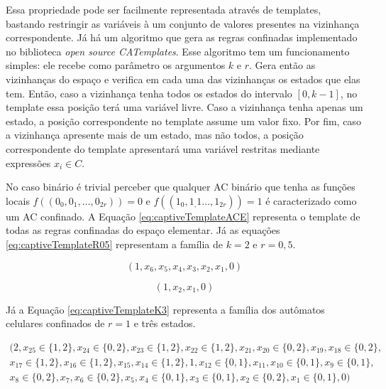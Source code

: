 \documentclass[12pt,a4paper]{article}
\begin{document}
	Essa propriedade pode ser facilmente representada através de templates, bastando restringir as variáveis à um conjunto de valores presentes na vizinhança correspondente. Já há um algoritmo que gera as regras confinadas implementado no biblioteca \textit{open source CATemplates}. Esse algoritmo tem um funcionamento simples: ele recebe como parâmetro os argumentos $k$ e $r$. Gera então as vizinhanças do espaço e verifica em cada uma das vizinhanças os estados que elas tem. Então, caso a vizinhança tenha todos os estados do intervalo $[0, k-1]$, no template essa posição terá uma variável livre. Caso a vizinhança tenha apenas um estado, a posição correspondente no template assume um valor fixo. Por fim, caso a vizinhança apresente mais de um estado, mas não todos, a posição correspondente do template apresentará uma variável restritas mediante expressões $x_i \in C$.

	No caso binário é trivial perceber que qualquer AC binário que tenha as funções locais $f((0_0, 0_1,\dots, 0_{2r})) = 0$ e $f((1_0, 1_,1\dots, 1_{2r})) = 1$ é caracterizado como um AC confinado. A Equação \ref{eq:captiveTemplateACE} representa o template de todas as regras confinadas do espaço elementar. Já as equações \ref{eq:captiveTemplateR05} representam a família de $k=2$ e $r=0,5$.

	\begin{equation}
	(1,x_6,x_5,x_4,x_3,x_2,x_1,0)
	\label{eq:captiveTemplateACE}
	\end{equation}

	\begin{equation}
	(1,x_2,x_1,0)
	\label{eq:captiveTemplateR05}
	\end{equation}

	Já a Equação \ref{eq:captiveTemplateK3} representa a família dos autômatos celulares confinados de $r=1$ e três estados.

	\begin{equation}
	\begin{split}
	(2, x_{25} \in \{1,2\}, x_{24} \in \{0,2\}, x_{23} \in \{1,2\}, x_{22} \in \{1,2\}, x_{21}, x_{20} \in \{0,2\}, x_{19}, x_{18} \in \{0,2\}, \\
	x_{17} \in \{1,2\}, x_{16} \in \{1,2\}, x_{15}, x_{14} \in \{1,2\},1, x_{12} \in \{0,1\}, x_{11}, x_{10} \in \{0,1\}, x_9 \in \{0,1\}, \\
	x_8 \in \{0,2\}, x_7, x_6 \in \{0,2\}, x_5, x_4 \in \{0,1\}, x_3 \in \{0,1\}, x_2 \in \{0,2\}, x_1 \in \{0,1\}, 0)
	\label{eq:captiveTemplateK3}
	\end{split}
	\end{equation}
\end{document}
